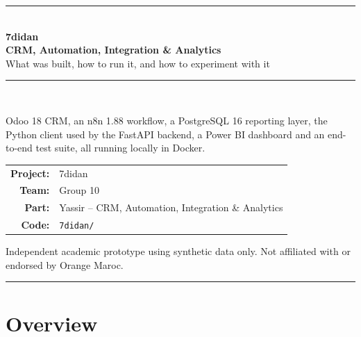 \documentclass[11pt,a4paper]{article}
\newcommand{\f}[1]{\texttt{#1}}
\begin{document}
\hypersetup{pageanchor=false}

\begin{titlepage}
  \thispagestyle{empty}
  \centering
  \vspace*{2.2cm}
  {\color{LeadBlue}\rule{\textwidth}{1.2pt}}\\[1.2cm]
  {\Huge\bfseries\color{LeadBlue} 7didan}\\[0.45cm]
  {\LARGE\bfseries CRM, Automation, Integration \& Analytics}\\[0.35cm]
  {\Large What was built, how to run it, and how to experiment with it}\\[1.2cm]
  {\color{LeadTeal}\rule{0.72\textwidth}{2pt}}\\[1.4cm]

  \begin{minipage}{0.84\textwidth}
    \centering\large
    Odoo 18 CRM, an n8n 1.88 workflow, a PostgreSQL 16 reporting layer,
    the Python client used by the FastAPI backend, a Power BI dashboard
    and an end-to-end test suite, all running locally in Docker.
  \end{minipage}

  \vfill
  \begin{tabular}{>{\bfseries}rl}
    Project: & 7didan \\
    Team: & Group 10 \\
    Part: & Yassir -- CRM, Automation, Integration \& Analytics \\
    Code: & \f{7didan/} \\
  \end{tabular}

  \vspace{1.2cm}
  \begin{minipage}{0.86\textwidth}
    \centering\small\color{LeadGray}
    Independent academic prototype using synthetic data only.
    Not affiliated with or endorsed by Orange Maroc.
  \end{minipage}
  \vspace{0.6cm}

  {\color{LeadBlue}\rule{\textwidth}{1.2pt}}
\end{titlepage}

\hypersetup{pageanchor=true}
\tableofcontents
\newpage
{}

\section{Overview}
\end{document}
